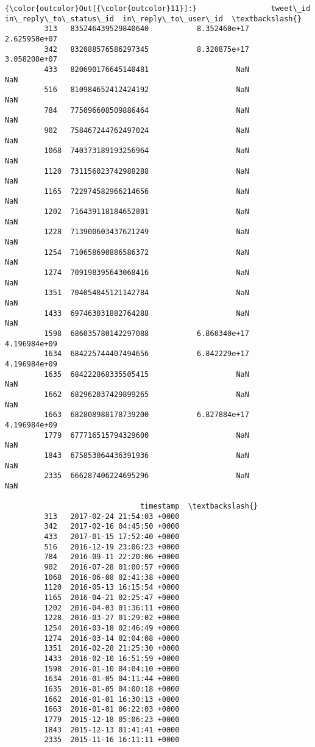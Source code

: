 \documentclass[11pt]{article}
\begin{document}
\begin{Verbatim}[commandchars=\\\{\}]
{\color{outcolor}Out[{\color{outcolor}11}]:}                 tweet\_id  in\_reply\_to\_status\_id  in\_reply\_to\_user\_id  \textbackslash{}
         313   835246439529840640           8.352460e+17         2.625958e+07   
         342   832088576586297345           8.320875e+17         3.058208e+07   
         433   820690176645140481                    NaN                  NaN   
         516   810984652412424192                    NaN                  NaN   
         784   775096608509886464                    NaN                  NaN   
         902   758467244762497024                    NaN                  NaN   
         1068  740373189193256964                    NaN                  NaN   
         1120  731156023742988288                    NaN                  NaN   
         1165  722974582966214656                    NaN                  NaN   
         1202  716439118184652801                    NaN                  NaN   
         1228  713900603437621249                    NaN                  NaN   
         1254  710658690886586372                    NaN                  NaN   
         1274  709198395643068416                    NaN                  NaN   
         1351  704054845121142784                    NaN                  NaN   
         1433  697463031882764288                    NaN                  NaN   
         1598  686035780142297088           6.860340e+17         4.196984e+09   
         1634  684225744407494656           6.842229e+17         4.196984e+09   
         1635  684222868335505415                    NaN                  NaN   
         1662  682962037429899265                    NaN                  NaN   
         1663  682808988178739200           6.827884e+17         4.196984e+09   
         1779  677716515794329600                    NaN                  NaN   
         1843  675853064436391936                    NaN                  NaN   
         2335  666287406224695296                    NaN                  NaN   
         
                               timestamp  \textbackslash{}
         313   2017-02-24 21:54:03 +0000   
         342   2017-02-16 04:45:50 +0000   
         433   2017-01-15 17:52:40 +0000   
         516   2016-12-19 23:06:23 +0000   
         784   2016-09-11 22:20:06 +0000   
         902   2016-07-28 01:00:57 +0000   
         1068  2016-06-08 02:41:38 +0000   
         1120  2016-05-13 16:15:54 +0000   
         1165  2016-04-21 02:25:47 +0000   
         1202  2016-04-03 01:36:11 +0000   
         1228  2016-03-27 01:29:02 +0000   
         1254  2016-03-18 02:46:49 +0000   
         1274  2016-03-14 02:04:08 +0000   
         1351  2016-02-28 21:25:30 +0000   
         1433  2016-02-10 16:51:59 +0000   
         1598  2016-01-10 04:04:10 +0000   
         1634  2016-01-05 04:11:44 +0000   
         1635  2016-01-05 04:00:18 +0000   
         1662  2016-01-01 16:30:13 +0000   
         1663  2016-01-01 06:22:03 +0000   
         1779  2015-12-18 05:06:23 +0000   
         1843  2015-12-13 01:41:41 +0000   
         2335  2015-11-16 16:11:11 +0000   
         

\end{Verbatim}
\end{document}
